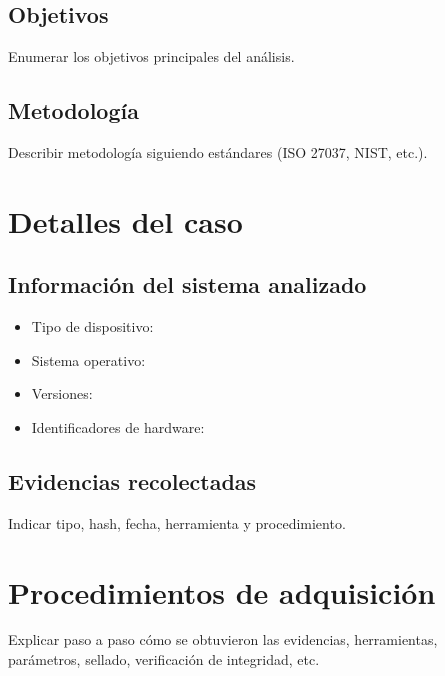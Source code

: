 \documentclass[12pt,a4paper]{article}
\begin{document}
\subsection{Objetivos}
Enumerar los objetivos principales del análisis.

\subsection{Metodología}
Describir metodología siguiendo estándares (ISO 27037, NIST, etc.).

\newpage

\section{Detalles del caso}

\subsection{Información del sistema analizado}
\begin{itemize}
    \item Tipo de dispositivo:
    \item Sistema operativo:
    \item Versiones:
    \item Identificadores de hardware:
\end{itemize}

\subsection{Evidencias recolectadas}
Indicar tipo, hash, fecha, herramienta y procedimiento.

\newpage

\section{Procedimientos de adquisición}
Explicar paso a paso cómo se obtuvieron las evidencias, herramientas, parámetros, sellado, verificación de integridad, etc.

\newpage

\end{document}
